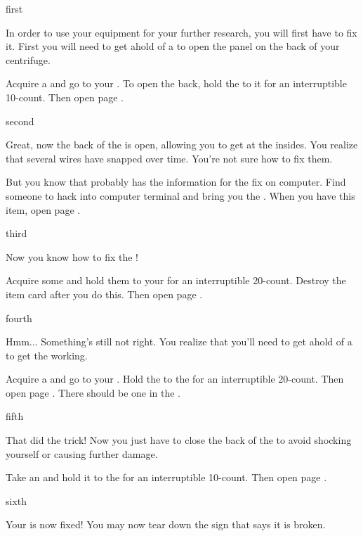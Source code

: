 \documentclass[greennotebook]{guildcamp4} %
\begin{document}
\startnotebook{\nJamesFixLab{}}

\begin{page}{first}

In order to use your equipment for your further research, you will first have to fix it. First you will need to get ahold of a \iWrench{} to open the panel on the back of your centrifuge.

Acquire a \iWrench{} and go to your \sCentrifugeBroken{}. To open the back, hold the \iWrench{} to it for an interruptible 10-count. Then open page .

\end{page}

\begin{page}{second}

Great, now the back of the \sCentrifugeBroken{} is open, allowing you to get at the insides. You realize that several wires have snapped over time. You're not sure how to fix them.

But you know that \cVthree{} probably has the information for the fix on \cVthree{\their} computer. Find someone to hack into \cVthree{\their} computer terminal and bring you the \iInformation{}. When you have this item, open page .

\end{page}

\begin{page}{third}

Now you know how to fix the \sCentrifugeBroken{}!

Acquire some \iWires{} and hold them to your \sCentrifugeBroken{} for an interruptible 20-count. Destroy the \iWires{} item card after you do this. Then open page .

\end{page}

\begin{page}{fourth}

Hmm... Something's still not right. You realize that you'll need to get ahold of a \iCalibrator{} to get the \sCentrifugeBroken{} working.

Acquire a \iCalibrator{} and go to your \sCentrifugeBroken{}. Hold the \iCalibrator{} to the \sCentrifugeBroken{} for an interruptible 20-count. Then open page . There should be one in the \sBioLab{}.

\end{page}

\begin{page}{fifth}

That did the trick! Now you just have to close the back of the \sCentrifugeBroken{} to avoid shocking yourself or causing further damage.

Take an \iWrench{} and hold it to the \sCentrifugeBroken{} for an interruptible 10-count. Then open page .

\end{page}

\begin{page}{sixth}

Your \sCentrifuge{} is now fixed! You may now tear down the sign that says it is broken.

\end{page}

\endnotebook
\end{document}
